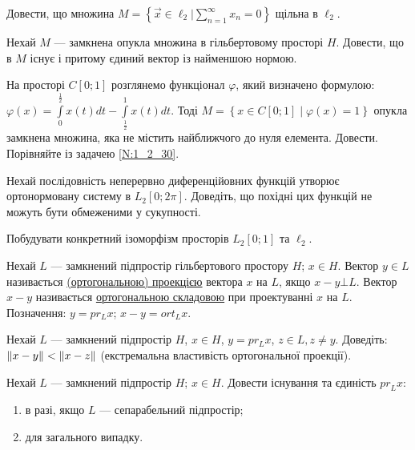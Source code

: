 
\begin{exercise}
    Довести, що множина $M = \left\{ \vec{x} \in \ell_2 | \sum\limits_{n = 1}^{\infty}x_n = 0\right\}$
    щільна в $\ell_2$.
\end{exercise}

\begin{exercise}\label{N:1_2_30}
    Нехай $M$ --- замкнена опукла множина в гільбертовому просторі $H$. Довести, що в $M$
    існує і притому єдиний вектор із найменшою нормою.
\end{exercise}

\begin{exercise}
    На просторі $C[0;1]$ розглянемо функціонал $\varphi$, який визначено формулою: 
    $\varphi(x) = \int\limits_{0}^{\frac{1}{2}}x(t)dt - \int\limits_{\frac{1}{2}}^{1}x(t)dt$. Тоді
    $M = \left\{x \in C[0; 1] \mid \varphi(x) = 1\right\}$ опукла замкнена множина, яка не містить найближчого до 
    нуля елемента. Довести. Порівняйте із задачею \ref{N:1_2_30}.
\end{exercise}

\begin{exercise}\label{N:1_2_32}
    Нехай послідовність неперервно диференційовних функцій утворює ортонормовану систему
    в $L_2[0; 2\pi]$. Доведіть, що похідні цих функцій не можуть бути обмеженими у сукупності.
\end{exercise}

\begin{exercise}
    Побудувати конкретний ізоморфізм просторів $L_2[0;1]$ та $\ell_2$.
\end{exercise}

\begin{theory}
    Нехай $L$ --- замкнений підпростір гільбертового простору $H$; $x \in H$. Вектор
    $y \in L$ називається \uline{(ортогональною) проекцією} вектора $x$ на $L$, якщо
    $x - y \bot L$. Вектор $x - y$ називається \uline{ортогональною складовою} при
    проектуванні $x$ на $L$. Позначення: $y = pr_L x$; $x - y = ort_L x$.
\end{theory}

\begin{exercise}
    Нехай $L$ --- замкнений підпростір $H$, $x \in H$, $y = pr_L x$, $z \in L, z \neq y$.
    Доведіть: $\left\lVert x - y\right\rVert < \left\lVert x - z\right\rVert$ (екстремальна властивість ортогональної проекції).
\end{exercise}

\begin{exercise}
    Нехай $L$ --- замкнений підпростір $H$; $x \in H$. Довести існування та єдиність ${pr}_L x$:
    \begin{enumerate}[label=\ukr*)]
        \item в разі, якщо $L$ --- сепарабельний підпростір;
        \item для загального випадку.
    \end{enumerate}
\end{exercise}

